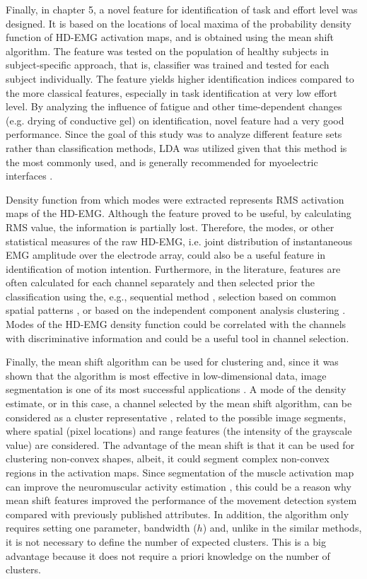 Finally, in chapter 5, a novel feature for identification of task and effort level was designed. It is based on the locations of local maxima of the probability density function of HD-EMG activation maps, and is obtained using the mean shift algorithm. The feature was tested on the population of healthy subjects in subject-specific approach, that is, classifier was trained and tested for each subject individually. The feature yields higher identification indices compared to the more classical features, especially in task identification at very low effort level. By analyzing the influence of fatigue and other time-dependent changes (e.g. drying of conductive gel) on identification, novel feature had a very good performance. Since the goal of this study was to analyze different feature sets rather than classification methods, LDA was utilized given that this method is the most commonly used, and is generally recommended for myoelectric interfaces \citep{Hakonen2015}.

Density function from which modes were extracted represents RMS activation maps of the HD-EMG. Although the feature proved to be useful, by calculating RMS value, the information is partially lost. Therefore, the modes, or other statistical measures of the raw HD-EMG, i.e. joint distribution of instantaneous EMG amplitude over the electrode array, could also be a useful feature in identification of motion intention. Furthermore, in the literature, features are often calculated for each channel separately and then selected prior the classification using the, e.g., sequential method \citep{Hargrove2009, Li2017}, selection based on common spatial patterns \citep{Geng2014}, or based on the independent component analysis clustering \citep{Naik2016}. Modes of the HD-EMG density function could be correlated with the channels with discriminative information and could be a useful tool in channel selection.

Finally, the mean shift algorithm can be used for clustering and, since it was shown that the algorithm is most effective in low-dimensional data, image segmentation is one of its most successful applications \citep{Comaniciu2002}. A mode of the density estimate, or in this case, a channel selected by the mean shift algorithm, can be considered as a cluster representative \citep{Hennig2015}, related to the possible image segments, where spatial (pixel locations) and range features (the intensity of the grayscale value) are considered. The advantage of the mean shift is that it can be used for clustering non-convex shapes, albeit, it could segment complex non-convex regions in the activation maps. Since segmentation of the muscle activation map can improve the neuromuscular activity estimation \citep{Vieira2010}, this could be a reason why mean shift features improved the performance of the movement detection system compared with previously published attributes. In addition, the algorithm only requires setting one parameter, bandwidth ($h$) and, unlike in the similar methods, it is not necessary to define the number of expected clusters. This is a big advantage because it does not require a priori knowledge on the number of clusters.

